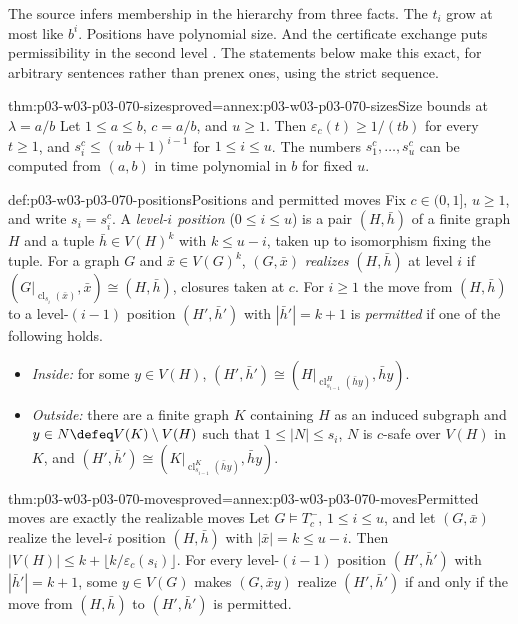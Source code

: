 The source infers membership in the hierarchy from three facts.  The
\(t_i\) grow at most like \(b^i\).  Positions have polynomial size.  And the
certificate exchange puts permissibility in the second level
\cite[pp.~20--21]{Spencer2007LogicRandomStructuresAuthor}.  The statements
below make this exact, for arbitrary sentences rather than prenex ones, using
the strict sequence.

\begin{hblemma}{thm:p03-w03-p03-070-sizes}{proved=annex:p03-w03-p03-070-sizes}{Size bounds at \(\lambda=a/b\)}
Let \(1\leq a\leq b\), \(c=a/b\), and \(u\geq1\).  Then
\(\varepsilon_c(t)\geq1/(tb)\) for every \(t\geq1\), and
\(s^c_i\leq(ub+1)^{i-1}\) for \(1\leq i\leq u\).  The numbers
\(s^c_1,\ldots,s^c_u\) can be computed from \((a,b)\) in time polynomial in
\(b\) for fixed \(u\).
\end{hblemma}

\begin{hbdefinition}{def:p03-w03-p03-070-positions}{Positions and permitted moves}
Fix \(c\in(0,1]\), \(u\geq1\), and write \(s_i=s^c_i\).  A \emph{level-\(i\)
position} (\(0\leq i\leq u\)) is a pair \((H,\bar h)\) of a finite graph \(H\)
and a tuple \(\bar h\in V(H)^k\) with \(k\leq u-i\), taken up to isomorphism
fixing the tuple.  For a graph \(G\) and \(\bar x\in V(G)^k\), \((G,\bar x)\)
\emph{realizes} \((H,\bar h)\) at level \(i\) if
\((G|_{\operatorname{cl}_{s_i}(\bar x)},\bar x)\cong(H,\bar h)\), closures
taken at \(c\).  For \(i\geq1\) the move from \((H,\bar h)\) to a
level-\((i-1)\) position \((H',\bar h')\) with \(|\bar h'|=k+1\) is
\emph{permitted} if one of the following holds.
\begin{itemize}
\item \emph{Inside:} for some \(y\in V(H)\),
      \((H',\bar h')\cong(H|_{\operatorname{cl}^H_{s_{i-1}}(\bar hy)},\bar hy)\).
\item \emph{Outside:} there are a finite graph \(K\) containing \(H\) as an
      induced subgraph and \(y\in N\defeq V(K)\setminus V(H)\) such that
      \(1\leq|N|\leq s_i\), \(N\) is \(c\)-safe over \(V(H)\) in \(K\), and
      \((H',\bar h')\cong(K|_{\operatorname{cl}^K_{s_{i-1}}(\bar hy)},\bar hy)\).
\end{itemize}
\end{hbdefinition}

\begin{hblemma}{thm:p03-w03-p03-070-moves}{proved=annex:p03-w03-p03-070-moves}{Permitted moves are exactly the realizable moves}
Let \(G\models T^-_c\), \(1\leq i\leq u\), and let \((G,\bar x)\) realize the
level-\(i\) position \((H,\bar h)\) with \(|\bar x|=k\leq u-i\).  Then
\(|V(H)|\leq k+\lfloor k/\varepsilon_c(s_i)\rfloor\).  For every level-\((i-1)\)
position \((H',\bar h')\) with \(|\bar h'|=k+1\), some \(y\in V(G)\) makes
\((G,\bar xy)\) realize \((H',\bar h')\) if and only if the move from
\((H,\bar h)\) to \((H',\bar h')\) is permitted.
\end{hblemma}

